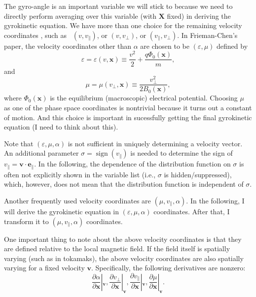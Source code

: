 \documentclass{article}
\newcommand{\nobracket}{}
\newcommand{\tmop}[1]{\ensuremath{\operatorname{#1}}}
\begin{document}
The gyro-angle is an important variable we will stick to because we need to
directly perform averaging over this variable (with $\mathbf{X}$ fixed) in
deriving the gyrokinetic equation. We have more than one choice for the
remaining velocity coordinates , such as \ $(v, v_{\parallel})$, or $(v,
v_{\perp})$, or $(v_{\parallel}, v_{\perp})$. In Frieman-Chen's paper, the
velocity coordinates other than $\alpha$ are chosen to be $(\varepsilon, \mu)$
defined by
\begin{equation}
  \varepsilon = \varepsilon (v, \mathbf{x}) \equiv \frac{v^2}{2} + \frac{q
  \Phi_0 (\mathbf{x})}{m},
\end{equation}
and
\begin{equation}
  \mu = \mu (v_{\perp}, \mathbf{x}) \equiv \frac{v_{\perp}^2}{2 B_0
  (\mathbf{x})},
\end{equation}
where $\Phi_0 (\mathbf{x})$ is the equilibrium (macroscopic) electrical
potential. Choosing $\mu$ as one of the phase space coordinates is nontrivial
because it turns out a constant of motion. And this choice is important in
sucessfully getting the final gyrokinetic equation (I need to think about
this).

Note that $(\varepsilon, \mu, \alpha)$ is not sufficient in uniquely
determining a velocity vector. An additional parameter $\sigma = \tmop{sign}
(v_{\parallel})$ is needed to determine the sign of $v_{\parallel} =\mathbf{v}
\cdot \mathbf{e}_{\parallel}$. In the following, the dependence of the
distribution function on $\sigma$ is often not explicitly shown in the
variable list (i.e., $\sigma$ is hidden/suppressed), which, however, does not
mean that the distribution function is independent of $\sigma$.

Another frequently used velocity coordinates are $(\mu, v_{\parallel},
\alpha)$. In the following, I will derive the gyrokinetic equation in
$(\varepsilon, \mu, \alpha)$ coordinates. After that, I transform it to $(\mu,
v_{\parallel}, \alpha)$ coordinates.

One important thing to note about the above velocity coordinates is that they
are defined relative to the local magnetic field. If the field itself is
spatially varying (such as in tokamaks), the above velocity coordinates are
also spatially varying for a fixed velocity $\mathbf{v}$. Specifically, the
following derivatives are nonzero:
\begin{equation}
  \frac{\partial \alpha}{\partial \mathbf{x}} |_{\mathbf{v}} \nobracket,
  \frac{\partial v_{\perp}}{\partial \mathbf{x}} |_{\mathbf{v}} \nobracket,
  \frac{\partial v_{\parallel}}{\partial \mathbf{x}} |_{\mathbf{v}}
  \nobracket, \frac{\partial \mu}{\partial \mathbf{x}} |_{\mathbf{v}}
  \nobracket .
\end{equation}
\end{document}
